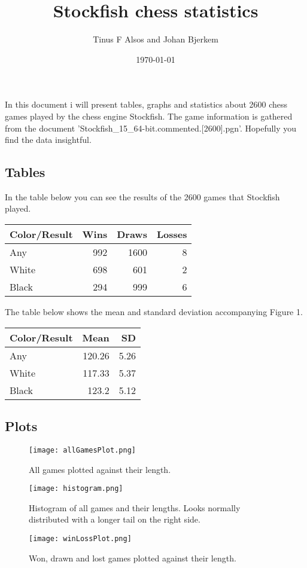 \documentclass{article}%
\title{Stockfish chess statistics}%
\author{Tinus F Alsos and Johan Bjerkem}%
\date{\today}%
\begin{document}
%
\normalsize%
\maketitle%
In this document i will present tables, graphs and statistics about 2600 chess games played by the chess engine Stockfish. The game information is gathered from the document 'Stockfish\_15\_64{-}bit.commented.{[}2600{]}.pgn'. Hopefully you find the data insightful.%
\subsection{Tables}%
\label{subsec:Tables}%
In the table below you can see the results of the 2600 games that Stockfish played.%
\linebreak%
\linebreak%
\begin{tabular}{l|rrr}%
Color/Result&Wins&Draws&Losses\\%
\hline%
Any&992&1600&8\\%
White&698&601&2\\%
Black&294&999&6\\%
\end{tabular}%
\linebreak%
\linebreak%
The table below shows the mean and standard deviation accompanying Figure 1.%
\linebreak%
\linebreak%
\begin{tabular}{l|rr}%
Color/Result&Mean&SD\\%
\hline%
Any&120.26&5.26\\%
White&117.33&5.37\\%
Black&123.2&5.12\\%
\end{tabular}

%
\subsection{Plots}%
\label{subsec:Plots}%


\begin{figure}[h!]%
\centering%
\texttt{[image: allGamesPlot.png]}%
\caption{All games plotted against their length.}%
\centering%
\texttt{[image: histogram.png]}%
\caption{Histogram of all games and their lengths. Looks normally distributed with a longer tail on the right side.}%
\centering%
\texttt{[image: winLossPlot.png]}%
\caption{Won, drawn and lost games plotted against their length.}%
\end{figure}

%
\end{document}
